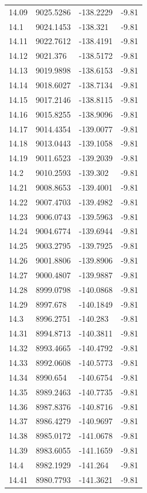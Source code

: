 \begin{table}[H]
\begin{tabular}{llll}
14.09 & 9025.5286 & -138.2229 & -9.81 \\
14.1 & 9024.1453 & -138.321 & -9.81 \\
14.11 & 9022.7612 & -138.4191 & -9.81 \\
14.12 & 9021.376 & -138.5172 & -9.81 \\
14.13 & 9019.9898 & -138.6153 & -9.81 \\
14.14 & 9018.6027 & -138.7134 & -9.81 \\
14.15 & 9017.2146 & -138.8115 & -9.81 \\
14.16 & 9015.8255 & -138.9096 & -9.81 \\
14.17 & 9014.4354 & -139.0077 & -9.81 \\
14.18 & 9013.0443 & -139.1058 & -9.81 \\
14.19 & 9011.6523 & -139.2039 & -9.81 \\
14.2 & 9010.2593 & -139.302 & -9.81 \\
14.21 & 9008.8653 & -139.4001 & -9.81 \\
14.22 & 9007.4703 & -139.4982 & -9.81 \\
14.23 & 9006.0743 & -139.5963 & -9.81 \\
14.24 & 9004.6774 & -139.6944 & -9.81 \\
14.25 & 9003.2795 & -139.7925 & -9.81 \\
14.26 & 9001.8806 & -139.8906 & -9.81 \\
14.27 & 9000.4807 & -139.9887 & -9.81 \\
14.28 & 8999.0798 & -140.0868 & -9.81 \\
14.29 & 8997.678 & -140.1849 & -9.81 \\
14.3 & 8996.2751 & -140.283 & -9.81 \\
14.31 & 8994.8713 & -140.3811 & -9.81 \\
14.32 & 8993.4665 & -140.4792 & -9.81 \\
14.33 & 8992.0608 & -140.5773 & -9.81 \\
14.34 & 8990.654 & -140.6754 & -9.81 \\
14.35 & 8989.2463 & -140.7735 & -9.81 \\
14.36 & 8987.8376 & -140.8716 & -9.81 \\
14.37 & 8986.4279 & -140.9697 & -9.81 \\
14.38 & 8985.0172 & -141.0678 & -9.81 \\
14.39 & 8983.6055 & -141.1659 & -9.81 \\
14.4 & 8982.1929 & -141.264 & -9.81 \\
14.41 & 8980.7793 & -141.3621 & -9.81 \\

\end{tabular}
\end{table}
